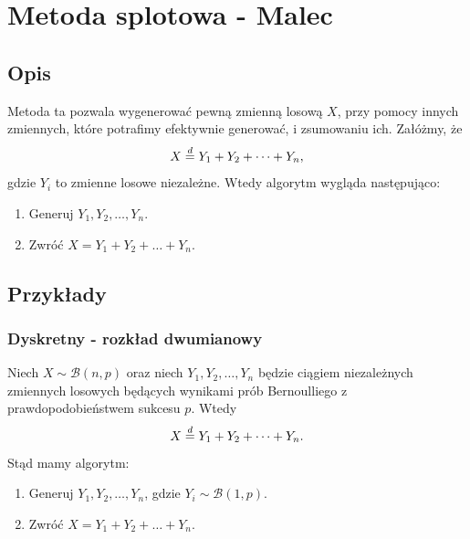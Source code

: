 \documentclass[12pt]{mwrep}
\begin{document}
%









	
	\section{Metoda splotowa - Malec}
	
	\subsection{Opis}
	\noindent Metoda ta pozwala wygenerować pewną zmienną losową $X$, przy pomocy innych zmiennych, które potrafimy efektywnie generować, i zsumowaniu ich. Załóżmy, że
	$$ X \buildrel{d} \over{=} Y_1 + Y_2 + \dots + Y_n, $$
	gdzie $Y_i$ to zmienne losowe niezależne. Wtedy algorytm wygląda następująco:
	\begin{enumerate}[leftmargin=10mm]
		\item Generuj $ Y_1, Y_2, \dots, Y_n $.
		\item Zwróć $ X = Y_1 + Y_2 + \dots + Y_n $.
	\end{enumerate}

	\subsection{Przykłady}
	
	\subsubsection{Dyskretny - rozkład dwumianowy}
	\noindent Niech $ X \sim \mathcal{B}(n, p) $ oraz niech $Y_1, Y_2, \dots, Y_n$ będzie ciągiem niezależnych zmiennych losowych będących wynikami prób Bernoulliego z prawdopodobieństwem sukcesu $p$. Wtedy
	$$ X \buildrel{d} \over{=} Y_1 + Y_2 + \dots + Y_n. $$
	Stąd mamy algorytm:
	\begin{enumerate}[leftmargin=10mm]
		\item Generuj $ Y_1, Y_2, \dots, Y_n $, gdzie $Y_i \sim \mathcal{B}(1, p) $.
		\item Zwróć $ X = Y_1 + Y_2 + \dots + Y_n $.
	\end{enumerate}
	
\end{document}
